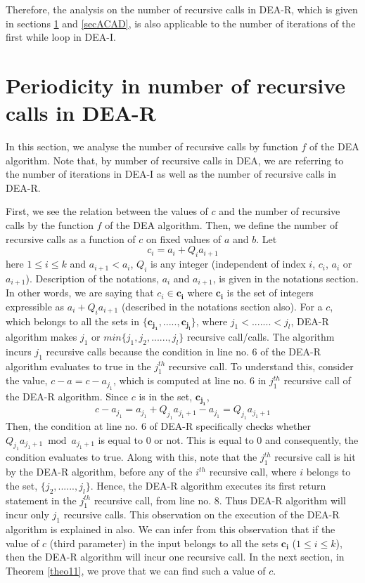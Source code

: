 \documentclass[pdflatex,sn-mathphys-num]{sn-jnl}%
\theoremstyle{thmstyleone}%
\theoremstyle{thmstyletwo}%
\theoremstyle{thmstylethree}%
\begin{document}
\par Therefore, the analysis on the number of recursive calls in DEA-R, which is given in sections \ref{secPNRC} and \ref{secACAD}, is also applicable to the number of iterations of the first while loop in DEA-I. 

\section{Periodicity in number of recursive calls in DEA-R}\label{secPNRC}

In this section, we analyse the number of recursive calls by function $f$ of the DEA algorithm. Note that, by number of recursive calls in DEA, we are referring to the number of iterations in DEA-I as well as the number of recursive calls in DEA-R.    




\par First, we see the relation between the values of $c$ and the number of recursive calls by the function  $f$ of the DEA algorithm. Then, we define the number of recursive calls as a function of $c$ on fixed values of $a$ and $b$. Let $$c_i=a_i+Q_ia_{i+1}$$ here $1 \le i \le k$ and $a_{i+1}<a_i$, $Q_i$ is any integer (independent of index $i$, $c_i$, $a_i$ or $a_{i+1}$). Description of the notations, $a_i$ and $a_{i+1}$, is given in the notations section. In other words, we are saying that $c_i \in \mathbf{c_i}$ where $\mathbf{c_i}$ is the set of integers expressible as $a_i+Q_ia_{i+1}$ (described in the notations section also). For a $c$, which belongs to all the sets in $\{\mathbf{c_{j_1}},.....,\mathbf{c_{j_l}}\}$, where $j_1<.......<j_l$, DEA-R algorithm makes $j_1$ or $min\{j_1,j_2,......,j_l   \}$ recursive call/calls.
 The algorithm incurs $j_1$ recursive calls because the condition in line no. 6 of the  DEA-R algorithm evaluates to true in the $j_{1}^{th}$ recursive call. To understand this, consider the value, $c-a=c-a_{j_1}$, which is computed at line no. 6 in $j_1^{th}$ recursive call of the DEA-R algorithm. Since $c$ is in the set, $\mathbf{c_{j_{1}}}$, $$c-a_{j_1}=a_{j_1}+Q_{j_1}a_{j_1+1}-a_{j_1}=Q_{j_1}a_{j_1+1}$$
 Then, the condition at line no. 6 of DEA-R specifically checks whether $Q_{j_1}a_{j_1+1} \bmod a_{j_1+1}$ is equal to $0$ or not. This is equal to $0$ and consequently, the condition evaluates to true. Along with this, note that the $j_1^{th}$ recursive call is hit by the DEA-R algorithm, before any of the $i^{th}$ recursive call, where $i$  belongs to the set, $\{j_2,......,j_l\}$. Hence, the DEA-R algorithm executes its first return statement in the $j_1^{th}$ recursive call,  from line no. 8. Thus DEA-R algorithm will incur only $j_1$ recursive calls.  
 This observation on the execution of the DEA-R algorithm is explained in \cite{deora2023algorithm} also. 
We can infer from this observation that if the value of $c$ (third parameter) in the input belongs to all the sets $\mathbf{c_i}$ ($1 \le i\le k$), then the DEA-R algorithm will incur one recursive call. In the next section,  in Theorem \ref{theo11}, we prove that we can find such a value of $c$.  
\end{document}
